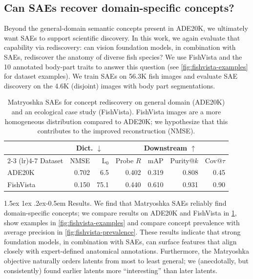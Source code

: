 \documentclass{article}
\makeatletter
\newcommand{\todo}[1]{\textbf{\color{red}[TODO: #1]}}
\newcommand{\sam}[1]{\textbf{\color{blue}[Sam: #1]}}
\newcommand{\jake}[1]{\textbf{\color{green}[Jake: #1]}}
\renewcommand{\paragraph}{%
  \@startsection{paragraph}{4}%
  {\z@}{1.5ex \@plus 1ex \@minus .2ex}{-0.5em}%
  {\normalfont\normalsize\bfseries}%
}
\theoremstyle{plain}
\theoremstyle{definition}
\theoremstyle{remark}
\makeatother
\begin{document}
\subsection{Can SAEs recover domain-specific concepts?}
\label{sec:fishvista}

Beyond the general-domain semantic concepts present in ADE20K, we ultimately want SAEs to support scientific discovery.
In this work, we again evaluate that capability via rediscovery: can vision foundation models, in combination with SAEs, rediscover the anatomy of diverse fish species? 
We use FishVista \citep{mehrab2024fishvista,fishvistadataset} and the 10 annotated body-part traits to answer this question (see \cref{fig:fishvista-examples} for dataset examples).
We train SAEs on \num{56.3}K fish images and evaluate SAE discovery on the \num{4.6}K (disjoint) images with body part segmentations.


\begin{table}[t]
    \centering
    \small
    \setlength{\tabcolsep}{3pt}
    \caption{Matryoshka SAEs for concept rediscovery on general domain (ADE20K) and an ecological case study (FishVista). FishVista images are a more homogeneous distribution compared to ADE20K; we hypothesize that this contributes to the improved reconstruction (NMSE).}
    \label{tab:fishvista}
    \begin{tabular}{lrrrrrr}
    \toprule
    & \multicolumn{2}{c}{Dict. $\downarrow$} & \multicolumn{4}{c}{Downstream $\uparrow$} \\
    \cmidrule(lr){2-3} \cmidrule(lr){4-7}
    Dataset & NMSE & L$_0$ & Probe $R$ & mAP & Purity@$k$ & Cov@$\tau$ \\
    \midrule
    ADE20K & 0.702 & 6.5 & 0.402 & 0.319 & 0.808 & 0.45 \\  %
    FishVista & 0.150 & 75.1 & 0.440 & 0.610 & 0.931 & 0.90 \\ %
    \bottomrule
    \end{tabular}
\end{table}


\paragraph{Results.}
We find that Matryoshka SAEs reliably find domain-specific concepts; we compare results on ADE20K and FishVista in \cref{tab:fishvista}, show examples in \cref{fig:fishvista-examples} and compare concept prevalence with average precision in \cref{fig:fishvista-prevalence}.
These results indicate that strong foundation models, in combination with SAEs, can surface features that align closely with expert-defined anatomical annotations.
Furthermore, the Matryoshka objective naturally orders latents from most to least general; we (anecdotally, but consistently) found earlier latents more ``interesting'' than later latents.
\end{document}
